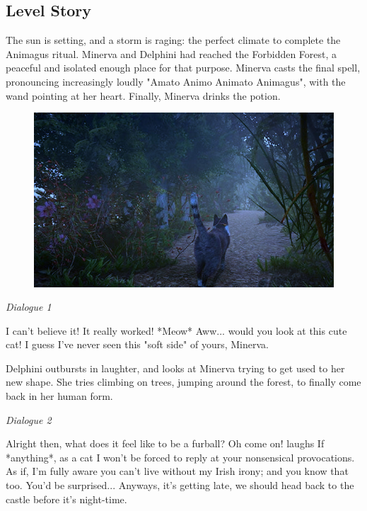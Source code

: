 \subsection*{Level Story}

The sun is setting, and a storm is raging: the perfect climate to complete the Animagus ritual. Minerva and Delphini had reached the Forbidden Forest, a peaceful and isolated enough place for that purpose. Minerva casts the final spell, pronouncing increasingly loudly "Amato Animo Animato Animagus", with the wand pointing at her heart. Finally, Minerva drinks the potion.

\begin{figure}[H]
\includegraphics[max width=\textwidth]{../Pictures/Level/Script/Minerva_cat_picture.jpg}
\end{figure} 

\textit{Dialogue 1}
\begin{dialogue}
 I can't believe it! It really worked!
 *Meow* 
 Aww... would you look at this cute cat! I guess I've never seen this "soft side" of yours, Minerva.
\end{dialogue} 

Delphini outbursts in laughter, and looks at Minerva trying to get used to her new shape. She tries climbing on trees, jumping around the forest, to finally come back in her human form. \\

\pagebreak

\textit{Dialogue 2}
\begin{dialogue}
 Alright then, what does it feel like to be a furball?
 Oh come on! \*laughs\* If *anything*, as a cat I won't be forced to reply at your nonsensical provocations.
 As if, I'm fully aware you can't live without my Irish irony; and you know that too.
 You'd be surprised... Anyways, it's getting late, we should head back to the castle before it's night-time.
\end{dialogue} 


